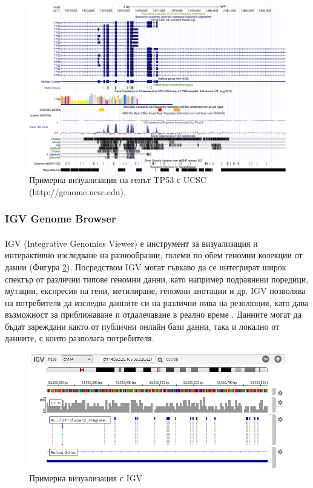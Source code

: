 \documentclass[pdftex,cyrillic,14pt,a4page,twoside,openright]{extreport}
\begin{document}
\begin{figure}[h]
  \centering
  \includegraphics[width=16cm]{figures/UCSC}
  \caption {Примерна визуализация на генът TP53 с UCSC (http://genome.ucsc.edu).}
  \label{fig:ucsc}
\end{figure}

\subsubsection{IGV Genome Browser}\label{sec:igv}
\paragraph{}
IGV (Integrative Genomics Viewer) е инструмент за визуализация и интерактивно изследване на разнообразни, големи по обем геномни колекции от данни (Фигура \ref{fig:igv_example}). Посредством IGV могат гъвкаво да се интегрират широк спектър от различни типове геномни данни, като например подравнени поредици, мутации, експресия на гени, метилиране, геномни анотации и др. IGV позволява на потребителя да изследва данните си на различни нива на резолюция, като дава възможност за приближаване и отдалечаване в реално време \cite{robinson2011, robinson2017}. Данните могат да бъдат зареждани както от публични онлайн бази данни, така и локално от данните, с които разполага потребителя.

\begin{figure}[h]
  \centering
  \includegraphics[width=17cm]{figures/igv_example}
  \caption {Примерна визуализация с IGV}
  \label{fig:igv_example}
\end{figure}
\end{document}

